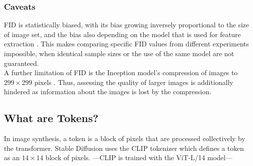\subsubsection{Caveats}
FID is statistically biased, with its bias growing inversely proportional to the size of image set, and the bias also depending on the model that is used for feature extraction \cite{Chong_2020_CVPR}. This makes comparing specific FID values from different experiments impossible, when identical sample sizes or the use of the same model are not guaranteed.\\
A further limitation of FID is the Inception model's compression of images to $299 \times 299$ pixels \cite{szegedy2016rethinking}. Thus, assessing the quality of larger images is additionally hindered as information about the images is lost by the compression.



\subsection{What are Tokens?}
In image synthesis, a token is a block of pixels that are processed collectively by the transformer. Stable Diffusion uses the CLIP tokenizer \cite{radford2021learning} which defines a token as an $14 \times 14$ block of pixels. ---CLIP is trained with the ViT-L/14 model---